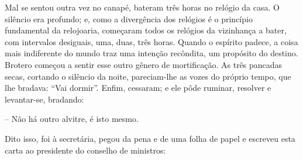 Mal se sentou outra vez no canapé, bateram três horas no relógio da
casa. O silêncio era profundo; e, como a divergência dos relógios é o
princípio fundamental da relojoaria, começaram todos os relógios da
vizinhança a bater, com intervalos desiguais, uma, duas, três horas.
Quando o espírito padece, a coisa mais indiferente do mundo traz uma
intenção recôndita, um propósito do destino. Brotero começou a sentir
esse outro gênero de mortificação. As três pancadas secas, cortando o
silêncio da noite, pareciam-lhe as vozes do próprio tempo, que lhe
bradava: ``Vai dormir''. Enfim, cessaram; e ele pôde ruminar, resolver e
levantar-se, bradando:

-- Não há outro alvitre, é isto mesmo.

Dito isso, foi à secretária, pegou da pena e de uma folha de papel e
escreveu esta carta ao presidente do conselho de ministros:

